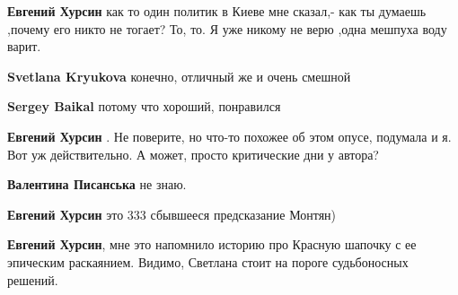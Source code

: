 \begin{itemize}
\begin{itemize}
\textbf{Евгений Хурсин} как то один политик в Киеве мне сказал,- как ты думаешь ,почему его никто не тогает? То, то. Я уже никому не верю ,одна мешпуха воду варит.

 

\textbf{Svetlana Kryukova} конечно, отличный же и очень смешной

 

\textbf{Sergey Baikal} потому что хороший, понравился

 
\textbf{Евгений Хурсин} . Не поверите, но что-то похожее об этом опусе, подумала и я. Вот уж действительно. А может, просто критические дни у автора?

 

\textbf{Валентина Писанська} не знаю.

 
\textbf{Евгений Хурсин} это 333 сбывшееся предсказание Монтян)

 
\textbf{Евгений Хурсин}, мне это напомнило историю про Красную шапочку с ее эпическим раскаянием. Видимо, Светлана стоит на пороге судьбоносных решений.


\end{itemize}
\end{itemize}
